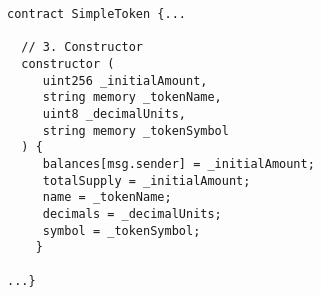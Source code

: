 \begin{lstlisting}[language=Solidity]
contract SimpleToken {...

  // 3. Constructor
  constructor (
     uint256 _initialAmount,
     string memory _tokenName,
     uint8 _decimalUnits,
     string memory _tokenSymbol
  ) {
     balances[msg.sender] = _initialAmount;               
     totalSupply = _initialAmount;                        
     name = _tokenName;                                   
     decimals = _decimalUnits;                            
     symbol = _tokenSymbol;                               
    }
    
...}
\end{lstlisting}